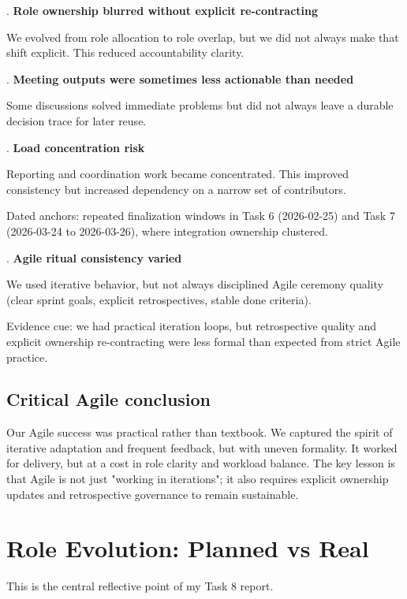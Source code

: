 . \textbf{Role ownership blurred without explicit re-contracting}

\noindent We evolved from role allocation to role overlap, but we did not always make that shift explicit. This reduced accountability clarity.


. \textbf{Meeting outputs were sometimes less actionable than needed}

\noindent Some discussions solved immediate problems but did not always leave a durable decision trace for later reuse.


. \textbf{Load concentration risk}

\noindent Reporting and coordination work became concentrated. This improved consistency but increased dependency on a narrow set of contributors.

\noindent Dated anchors: repeated finalization windows in Task 6 (2026-02-25) and Task 7 (2026-03-24 to 2026-03-26), where integration ownership clustered.


. \textbf{Agile ritual consistency varied}

\noindent We used iterative behavior, but not always disciplined Agile ceremony quality (clear sprint goals, explicit retrospectives, stable done criteria).

\noindent Evidence cue: we had practical iteration loops, but retrospective quality and explicit ownership re-contracting were less formal than expected from strict Agile practice.


\section{Critical Agile conclusion}


\noindent Our Agile success was practical rather than textbook. We captured the spirit of iterative adaptation and frequent feedback, but with uneven formality. It worked for delivery, but at a cost in role clarity and workload balance. The key lesson is that Agile is not just "working in iterations"; it also requires explicit ownership updates and retrospective governance to remain sustainable.


\chapter{Role Evolution: Planned vs Real}


\noindent This is the central reflective point of my Task 8 report.


